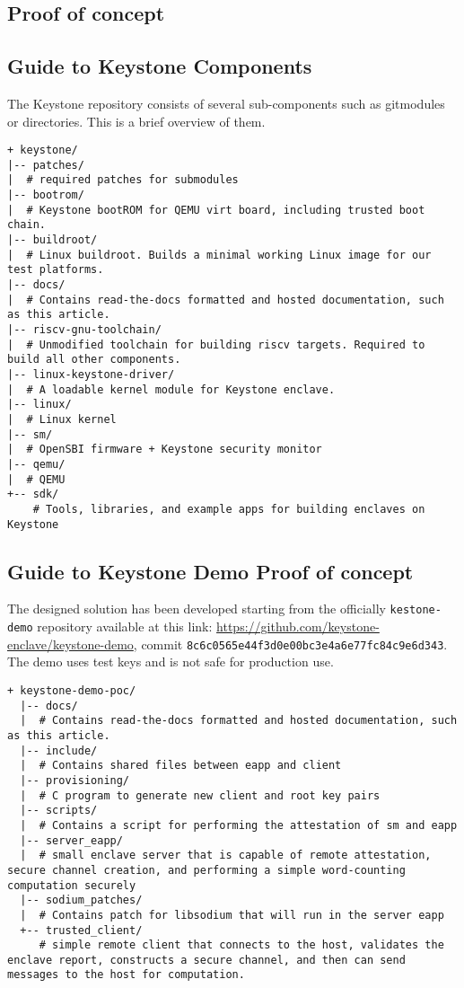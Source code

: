 
\subsection{Proof of concept}
\subsection*{Guide to Keystone Components}
The Keystone repository consists of several sub-components such as gitmodules or directories. This is a brief overview of them.
\begin{lstlisting}[frame=single]
+ keystone/
|-- patches/
|  # required patches for submodules
|-- bootrom/
|  # Keystone bootROM for QEMU virt board, including trusted boot chain.
|-- buildroot/
|  # Linux buildroot. Builds a minimal working Linux image for our test platforms.
|-- docs/
|  # Contains read-the-docs formatted and hosted documentation, such as this article.
|-- riscv-gnu-toolchain/
|  # Unmodified toolchain for building riscv targets. Required to build all other components.
|-- linux-keystone-driver/
|  # A loadable kernel module for Keystone enclave.
|-- linux/
|  # Linux kernel
|-- sm/
|  # OpenSBI firmware + Keystone security monitor
|-- qemu/
|  # QEMU
+-- sdk/
    # Tools, libraries, and example apps for building enclaves on Keystone        
\end{lstlisting}

\subsection*{Guide to Keystone Demo Proof of concept}
The designed solution has been developed starting from the officially \texttt{kestone-demo} repository available at this link: \url{https://github.com/keystone-enclave/keystone-demo}, commit \texttt{8c6c0565e44f3d0e00bc3e4a6e77fc84c9e6d343}. The demo uses test keys and is not safe for production use.
\begin{lstlisting}[frame=single]
  + keystone-demo-poc/
  |-- docs/
  |  # Contains read-the-docs formatted and hosted documentation, such as this article.
  |-- include/
  |  # Contains shared files between eapp and client
  |-- provisioning/
  |  # C program to generate new client and root key pairs
  |-- scripts/
  |  # Contains a script for performing the attestation of sm and eapp
  |-- server_eapp/
  |  # small enclave server that is capable of remote attestation, secure channel creation, and performing a simple word-counting computation securely
  |-- sodium_patches/
  |  # Contains patch for libsodium that will run in the server eapp
  +-- trusted_client/
     # simple remote client that connects to the host, validates the enclave report, constructs a secure channel, and then can send messages to the host for computation.       
  \end{lstlisting}

